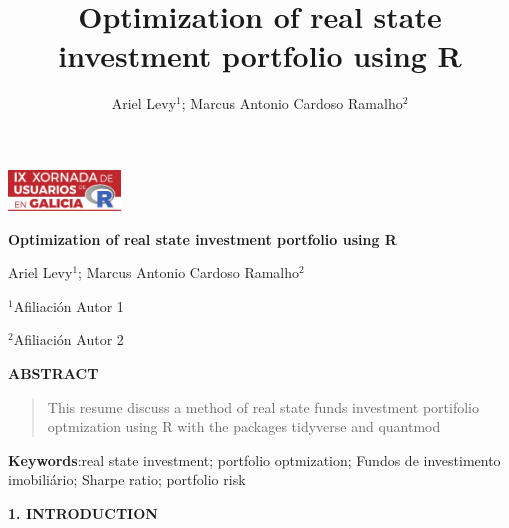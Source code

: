 \documentclass[
]{article}
\title{Optimization of real state investment portfolio using R}
\author{Ariel Levy\(^{1}\); Marcus Antonio Cardoso Ramalho\(^{2}\)}
\date{}
\begin{document}
\begin{flushright}
\includegraphics[angle=0,keepaspectratio,width=3cm]{logo.pdf}
\end{flushright}

 \vspace{20pt}

\begin{center}
\textbf{Optimization of real state investment portfolio using R}

\vspace{0.15cm}

Ariel Levy\(^{1}\); Marcus Antonio Cardoso Ramalho\(^{2}\) 
\end{center}

\vspace{0.06cm}

$^{1}$Afiliaci\'on Autor 1

$^{2}$Afiliaci\'on Autor 2

\begin{center}
\textbf{ABSTRACT}
\end{center}

\begin{quotation}
\noindent This resume discuss a method of real state funds investment
portifolio optmization using R with the packages tidyverse and quantmod
\end{quotation}

\vspace{0.4cm}

\textbf{Keywords}:real state investment; portfolio optmization; Fundos
de investimento imobiliário; Sharpe ratio; portfolio risk

\vspace{0.4cm}

\ifdefined\Shaded\renewenvironment{Shaded}{\begin{tcolorbox}[sharp corners, borderline west={3pt}{0pt}{shadecolor}, breakable, enhanced, boxrule=0pt, interior hidden, frame hidden]}{\end{tcolorbox}}\fi

\pagestyle{empty}
\setlength\parindent{0pt}

\begin{center}
\textbf{1. INTRODUCTION}
\end{center}
\end{document}
